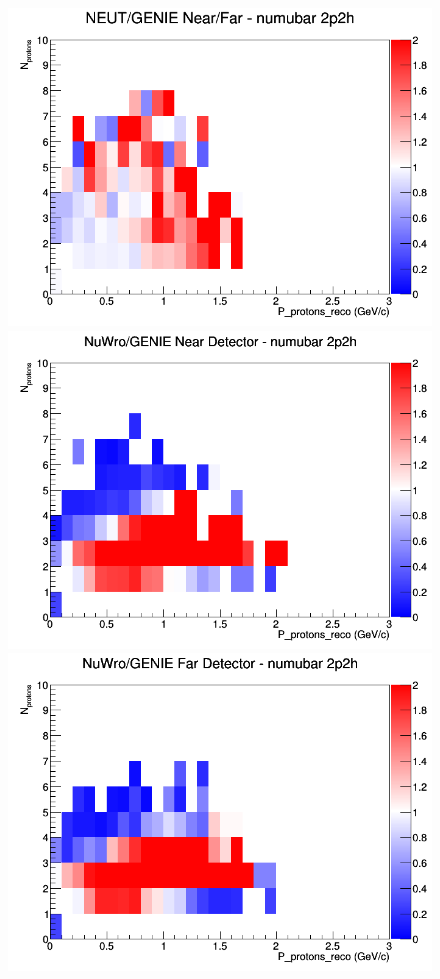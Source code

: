 \begin{figure}[h]
\endminipage
{}
\includegraphics[width=\linewidth]{eff_N_P/LAr/protons/ratios/2p2h_NEUT_GENIE_numubar_NF_N_P.png}
\endminipage
\newline
{}
\includegraphics[width=\linewidth]{eff_N_P/LAr/protons/ratios/2p2h_NuWro_GENIE_numubar_near_N_P.png}
\endminipage
{}
\includegraphics[width=\linewidth]{eff_N_P/LAr/protons/ratios/2p2h_NuWro_GENIE_numubar_far_N_P.png}

\end{figure}
